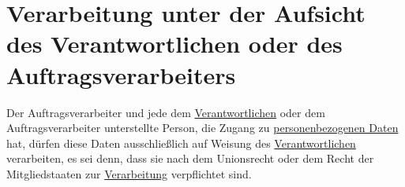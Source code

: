 \chapter{Verarbeitung unter der Aufsicht des Verantwortlichen oder des Auftragsverarbeiters}
\label{ch:29}


Der Auftragsverarbeiter und jede dem \hyperref[itm:04-7]{Verantwortlichen} oder dem Auftragsverarbeiter unterstellte Person, die Zugang zu
\hyperref[itm:04-1]{personenbezogenen Daten} hat, dürfen diese Daten ausschließlich auf Weisung des \hyperref[itm:04-7]{Verantwortlichen} verarbeiten, es sei
denn, dass sie nach dem Unionsrecht oder dem Recht der Mitgliedstaaten zur \hyperref[itm:04-2]{Verarbeitung} verpflichtet sind.


